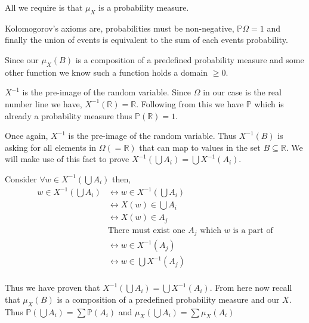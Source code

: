 \documentclass{article}
\newcommand{\prob}{\mathbb{P}}
\begin{document}
All we require is that
$\mu_X$ is a probability measure.

Kolomogorov's axioms are,
probabilities must be non-negative,
$\prob{\Omega} = 1$ and finally the union of events
is equivalent to the sum of each events probability.

Since our $\mu_X(B)$ is a composition of a predefined probability measure and 
some other function we know such a function holds a domain $\geq 0$.

$X^{-1}$ is the pre-image of the random variable.
Since $\Omega$ in our case is the real number line we have,
$X^{-1}(\mathbb{R}) = \mathbb{R}$.
Following from this we have $\prob$ which is already a probability
measure thus $\prob(\mathbb{R}) = 1$.

Once again, $X^{-1}$ is the pre-image of the random variable.
Thus $X^{-1}(B)$ is asking for all elements in $\Omega (= \mathbb{R})$ that can
map to values in the set $B \subseteq \mathbb{R}$.
We will make use of this fact to prove $X^{-1}(\bigcup A_i) = \bigcup X^{-1}(A_i)$.

Consider $\forall w \in X^{-1}(\bigcup A_i)$ then,
\begin{align*}
    w \in X^{-1}\left(\bigcup A_i\right) &\leftrightarrow w \in X^{-1}\left(\bigcup A_i\right) \\
    &\leftrightarrow X(w) \in \bigcup A_i \\
    &\leftrightarrow X(w) \in A_j \\
    &\text{There must exist one $A_j$ which $w$ is a part of} \\
    &\leftrightarrow w \in X^{-1}(A_j) \\
    &\leftrightarrow w \in \bigcup X^{-1}(A_j) \\
\end{align*}

Thus we have proven that $X^{-1}(\bigcup A_i) = \bigcup X^{-1}(A_i)$. From here
now recall that $\mu_X(B)$ is a composition of a predefined probability measure
and our $X$. Thus $\prob (\bigcup A_i) = \sum \prob(A_i)$ and
$\mu_X (\bigcup A_i) = \sum \mu_X(A_i)$
\end{document}
